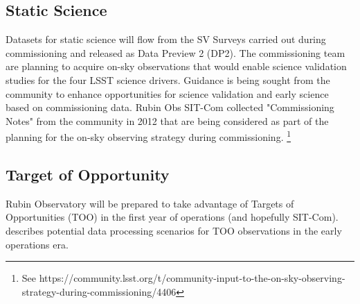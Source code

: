 \subsection{Static Science}
 
Datasets for static science will flow from the SV Surveys carried out during commissioning and released as Data Preview 2 (DP2). 
The commissioning team are planning to acquire on-sky observations that would enable science validation studies for the four LSST science drivers.
Guidance is being sought from the community to enhance opportunities for science validation and early science  based on commissioning data.
Rubin Obs SIT-Com collected "Commissioning Notes" from the community in 2012 that are being considered as part of the 
planning for the on-sky observing strategy during commissioning. \footnote {See https://community.lsst.org/t/community-input-to-the-on-sky-observing-strategy-during-commissioning/4406}


\subsection{Target of Opportunity}

Rubin Observatory will be prepared to take advantage of Targets of Opportunities (TOO) in the first year of operations (and hopefully SIT-Com). 
 describes potential data processing scenarios for TOO observations in the early operations era.